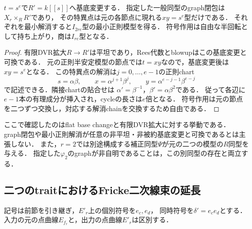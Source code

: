 \begin{proposition}[有限分岐基底変更]
\label{prop:qa-boundary-graph-ramified-base-change}
$t=s^e$で$R'=k[[s]]$へ基底変更する．
指定した一般同型のgraph閉包は$X_r\times_RR'$であり，
その特異点は元の各節点に現れる$xy=s^e$型だけである．
それぞれを最小解消すると$I_{2re}$型の最小正則模型を得る．
符号作用は自由な半回転として持ち上がり，商は$I_{re}$型となる．
\end{proposition}
\begin{proof}
有限DVR拡大$R\to R'$は平坦であり，Rees代数とblowupはこの基底変更と可換である．
元の正則半安定模型の節点では$t=xy$なので，基底変更後は$xy=s^e$となる．
この特異点の解消は$j=0,\ldots,e-1$の正則chart
\[
 s=\alpha\beta,\qquad
 x=\alpha^{j+1}\beta^j,\qquad
 y=\alpha^{e-j-1}\beta^{e-j}
\]
で記述できる．隣接chartの貼合せは
$\alpha'=\beta^{-1}$，$\beta'=\alpha\beta^2$である．
従って各辺に$e-1$本の有理成分が挿入され，cycleの長さは$e$倍となる．
符号作用は元の節点を二つずつ交換し，対応する解消chainを交換するため自由である．
\end{proof}

\begin{remark}[基底変更の範囲]
ここで確認したのはflat base changeと有限DVR拡大に対する挙動である．
graph閉包や最小正則解消が任意の非平坦・非被約基底変更と可換であるとは主張しない．
また，$r=2$では別途構成する補正同型$\Psi$が元の二つの模型の$R$同型を与える．
指定した$\varphi_2$のgraphが非自明であることは，この別同型の存在と両立する．
\end{remark}

\subsection{二つのtraitにおけるFricke二次線束の延長}

記号は前節を引き継ぎ，$E'_r$上の個別符号を$e_c,e_d$，
同時符号を$\delta'=e_ce_d$とする．
入力の元の点曲線$E_{f_r}$と，出力の点曲線$E'_r$は区別する．


